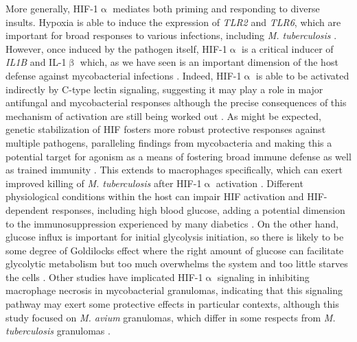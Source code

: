 More generally, HIF\hyp{}1$\upalpha$ mediates both priming and responding to diverse insults. Hypoxia is able to induce the expression of \textit{TLR2} and \textit{TLR6}, which are important for broad responses to various infections, including \textit{M. tuberculosis} \citep{Kuhlicke2007}. However, once induced by the pathogen itself, HIF\hyp{}1$\upalpha$ is a critical inducer of \textit{IL1B} and IL\hyp{}1$\upbeta$ which, as we have seen is an important dimension of the host defense against mycobacterial infections \citep{Ogryzko2019}. Indeed, HIF-1$\upalpha$ is able to be activated indirectly by C\hyp{}type lectin signaling, suggesting it may play a role in major antifungal and mycobacterial responses although the precise consequences of this mechanism of activation are still being worked out \citep{Elder2019, Friedrich2017}. As might be expected, genetic stabilization of HIF fosters more robust protective responses against multiple pathogens, paralleling findings from mycobacteria and making this a potential target for agonism as a means of fostering broad immune defense as well as trained immunity \citep{Schild2020}. This extends to macrophages specifically, which can exert improved killing of \textit{M. tuberculosis} after HIF\hyp{}1$\upalpha$ activation \citep{Li2021}. Different physiological conditions within the host can impair HIF activation and HIF\hyp{}dependent responses, including high blood glucose, adding a potential dimension to the immunosuppression experienced by many diabetics \citep{Teran2022}. On the other hand, glucose influx is important for initial glycolysis initiation, so there is likely to be some degree of Goldilocks effect where the right amount of glucose can facilitate glycolytic metabolism but too much overwhelms the system and too little starves the cells \citep{Stunault2018}. Other studies have implicated HIF\hyp{}1$\upalpha$ signaling in inhibiting macrophage necrosis in mycobacterial granulomas, indicating that this signaling pathway may exert some protective effects in particular contexts, although this study focused on \textit{M. avium} granulomas, which differ in some respects from \textit{M. tuberculosis} granulomas \citep{Cardoso2015}.

